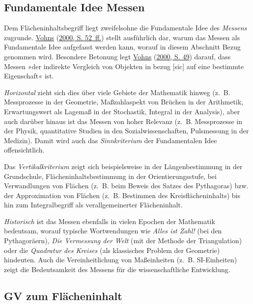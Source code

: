 \documentclass[
  ngerman,
]{scrbook}
\theoremstyle{definition}
\theoremstyle{definition}
\theoremstyle{definition}
\theoremstyle{definition}
\theoremstyle{remark}
\begin{document}
\hypertarget{fundamentale-idee-messen}{%
\subsection{Fundamentale Idee Messen}\label{fundamentale-idee-messen}}

Dem Flächeninhaltsbegriff liegt zweifelsohne die Fundamentale Idee des \emph{Messens} zugrunde. \protect\hyperlink{ref-Vohns:2000}{Vohns} (\protect\hyperlink{ref-Vohns:2000}{2000, S. 52~ff.}) stellt ausführlich dar, warum das Messen als Fundamentale Idee aufgefasst werden kann, worauf in diesem Abschnitt Bezug genommen wird. Besondere Betonung legt \protect\hyperlink{ref-Vohns:2000}{Vohns} (\protect\hyperlink{ref-Vohns:2000}{2000, S. 49}) darauf, dass Messen »der indirekte Vergleich von Objekten in bezug {[}sic{]} auf eine bestimmte Eigenschaft« ist.

\emph{Horizontal} zieht sich dies über viele Gebiete der Mathematik hinweg (z.~B. Messprozesse in der Geometrie, Maßzahlaspekt von Brüchen in der Arithmetik, Erwartungswert als Lagemaß in der Stochastik, Integral in der Analysis), aber auch darüber hinaus ist das Messen von hoher Relevanz (z.~B. Messprozesse in der Physik, quantitative Studien in den Sozialwissenschaften, Pulsmessung in der Medizin). Damit wird auch das \emph{Sinnkriterium} der Fundamentalen Idee offensichtlich.

Das \emph{Vertikalkriterium} zeigt sich beispielsweise in der Längenbestimmung in der Grundschule, Flächeninhaltsbestimmung in der Orientierungsstufe, bei Verwandlungen von Flächen (z.~B. beim Beweis des Satzes des Pythagoras) bzw. der Approximation von Flächen (z.~B. Bestimmen des Kreisflächeninhalts) bis hin zum Integralbegriff als verallgemeinerter Flächeninhalt.

\emph{Historisch} ist das Messen ebenfalls in vielen Epochen der Mathematik bedeutsam, worauf typische Wortwendungen wie \emph{Alles ist Zahl!} (bei den Pythagoräern), \emph{Die Vermessung der Welt} (mit der Methode der Triangulation) oder die \emph{Quadratur des Kreises} (als klassisches Problem der Geometrie) hindeuten. Auch die Vereinheitlichung von Maßeinheiten (z.~B. SI-Einheiten) zeigt die Bedeutsamkeit des Messens für die wissenschaftliche Entwicklung.

\hypertarget{gv-zum-fluxe4cheninhalt}{%
\subsection{GV zum Flächeninhalt}\label{gv-zum-fluxe4cheninhalt}}
\end{document}
